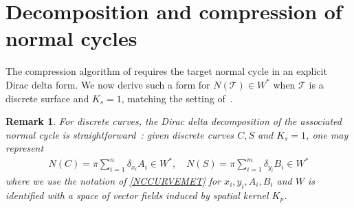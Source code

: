 \documentclass[sn-mathphys-num]{sn-jnl}%
\theoremstyle{thmstyleone}%
\theoremstyle{thmstyletwo}%
\newtheorem{remark}{Remark}%
\theoremstyle{thmstylethree}%
\numberwithin{remark}{section}
\numberwithin{definition}{section}
\numberwithin{equation}{section}
\numberwithin{theorem}{section}
\newcommand{\R}{\ensuremath{\mathbb{R}}}%
\begin{document}
\section{Decomposition and compression of normal cycles}\label{mainsec}
The compression algorithm of \cite{SparseNystromCurrVar} requires the target normal cycle in an explicit Dirac delta form. We now derive such a form for $N(\mathcal{T}) \in W^{*}$ when $\mathcal{T}$ is a discrete surface and $K_{s}=1$, matching the setting of~\cite{NCpaper}.
\begin{remark}
For discrete curves, the Dirac delta decomposition of the associated normal cycle is straightforward~\cite{NCThesis}: given discrete curves $C,S$ and $K_{s}=1$, one may represent
\begin{align*}
N(C)= \pi\sum_{i=1}^{n}{\delta_{x_{i}}A_{i} } \in W^{*},\quad N(S)=\pi\sum_{i=1}^{m} {\delta_{y_{i}}B_{i} } \in W^{*}
\end{align*}
where we use the notation of \cref{NCCURVEMET} for $x_{i},y_{i},A_{i},B_{i}$ and $W$ is identified with a space of vector fields induced by spatial kernel $K_{p}$.
\end{remark}

\end{document}
